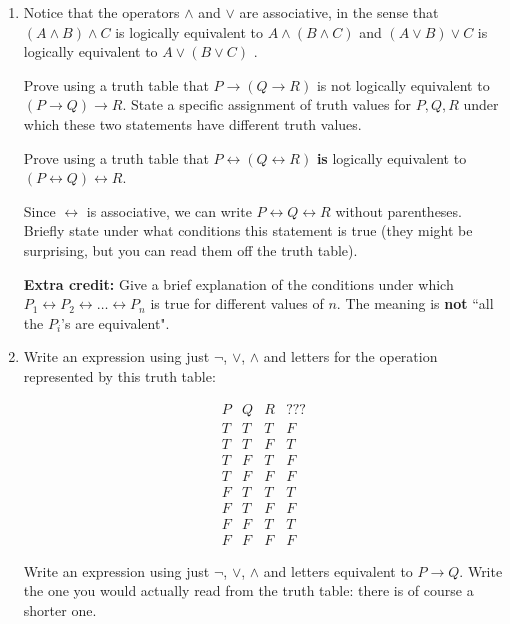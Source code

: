 \documentclass[12pt]{article}
\begin{document}
\begin{enumerate}

\item  Notice that the operators $\wedge$ and $\vee$ are associative, in the sense that $(A \wedge B) \wedge C$ is logically equivalent to 
$A \wedge (B \wedge C)$ and $(A \vee B) \vee C$ is logically equivalent to 
$A \vee (B \vee C)$ .

Prove using a truth table that $P \rightarrow (Q \rightarrow R)$ is not logically equivalent to $(P \rightarrow Q) \rightarrow R$.  State a specific assignment of truth values for $P, Q, R$ under which these two statements have different truth values.

Prove using a truth table that $P \leftrightarrow (Q \leftrightarrow R)$ {\bf is\/} logically equivalent to $(P \leftrightarrow Q) \leftrightarrow R$.

Since $\leftrightarrow$ is associative, we can write $P \leftrightarrow Q \leftrightarrow R$ without parentheses.  Briefly state under what conditions this
statement is true (they might be surprising, but you can read them off the truth table).

{\bf Extra credit:\/}  Give a brief explanation of the conditions under which $P_1 \leftrightarrow P_2 \leftrightarrow \ldots \leftrightarrow P_n$ is true for different values of $n$.  The meaning is {\bf not} ``all the $P_i$'s are equivalent".

\item 

Write an expression using just $\neg$, $\vee$, $\wedge$ and letters for the operation represented by this truth table:

$$\begin{array}{ccc|c}

P & Q & R & ??? \\ \hline

T  &  T  &  T & F \\
T  &  T  &  F & T \\
T  &  F  &  T & F \\
T  &  F &  F & F \\
F  &  T  &  T & T \\
F  &  T  &  F & F \\
F  &  F &  T & T \\
F  &  F  &  F & F \end{array}$$

Write an expression using just $\neg$, $\vee$, $\wedge$ and letters equivalent to $P \rightarrow Q$.  Write the one you would actually read from the truth table:  there is of course a shorter one.


\end{enumerate}
\end{document}
